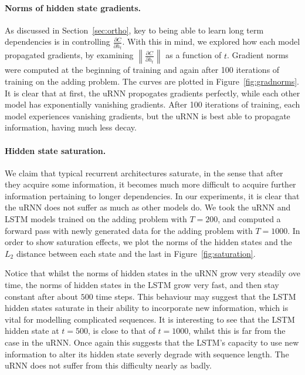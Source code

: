 \documentclass{article} %
\newcommand\norm[1]{\left\lVert#1\right\rVert}
\begin{document}
\paragraph{Norms of hidden state gradients.} As discussed in Section~\ref{sec:ortho}, key to being able to learn long term 
dependencies is in controlling $\frac{\partial C}{\partial h_t}$. 
With this in mind, we explored how each model propagated gradients, by examining 
$\norm{\frac{\partial C}{\partial h_t}}$ as a function of $t$. 
Gradient norms were computed at the beginning of training and again after 100 iterations of
training on the adding problem. The curves are plotted in Figure~\ref{fig:gradnorms}.
It is clear that at first, the uRNN propogates gradients perfectly, while each other model has 
exponentially vanishing gradients. 
After 100 iterations of training, each model experiences vanishing gradients, 
but the uRNN is best able to propagate information, having much less decay.

\paragraph{Hidden state saturation.} We claim that typical recurrent architectures saturate, in the 
sense that after they acquire some information, it becomes much more difficult to acquire further information pertaining
to longer dependencies. In our experiments, it is clear that the uRNN does not suffer as much as other models do. 
We took the uRNN and LSTM models trained on the adding problem with $T=200$, and computed 
a forward pass with newly generated data for the adding problem with $T=1000$. In order to show saturation
effects, we plot the norms of the hidden states and the $L_2$ distance between each state and the last in
Figure~\ref{fig:saturation}.    

Notice that whilst the norms of hidden states in the uRNN grow very steadily ove time, the norms of hidden
states in the LSTM grow very fast, and then stay constant after about $500$ time steps. This behaviour may
suggest that the LSTM hidden states saturate in their ability to incorporate new information, which is vital
for modelling complicated sequences. It is interesting to see that the LSTM hidden state at $t=500$, 
is close to that of $t=1000$, whilst this is far from the case in the uRNN. Once again this suggests that
the LSTM's capacity to use new information to alter its hidden state severly degrade with sequence length.
The uRNN does not suffer from this difficulty nearly as badly. 
\end{document}
